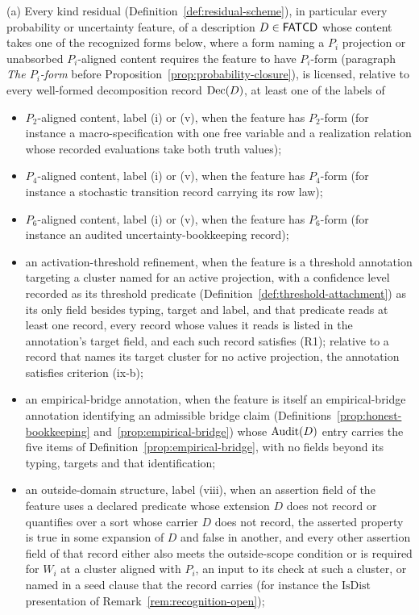 \begin{proposition}\label{prop:probability-closure}
\textup{(a)} Every kind residual (Definition~\ref{def:residual-scheme}), in particular every probability or uncertainty feature, of a description
\(D \in \mathsf{FATCD}{}\) whose content takes one of the recognized forms below,
where a form naming a \(P_i\) projection or unabsorbed \(P_i\)-aligned content
requires the feature to have \(P_i\)-form (paragraph \emph{The \(P_i\)-form}
before Proposition~\ref{prop:probability-closure}),
is licensed, relative to every well-formed decomposition record \(\operatorname{Dec}\!\left(D\right)\), at least one of the labels of
\begin{itemize}[topsep=2pt,itemsep=1pt]
  \item \(P_2\)-aligned content, label (i) or (v), when the feature has \(P_2\)-form (for
    instance a macro-specification with one free variable and a realization
    relation whose recorded evaluations take both truth values);
  \item \(P_4\)-aligned content, label (i) or (v), when the feature has \(P_4\)-form (for
    instance a stochastic transition record carrying its row law);
  \item \(P_6\)-aligned content, label (i) or (v), when the feature has \(P_6\)-form (for
    instance an audited uncertainty-bookkeeping record);
  \item an activation-threshold refinement, when the feature is a threshold
    annotation targeting a cluster named for an active projection, with a
    confidence level recorded as its threshold predicate
    (Definition~\ref{def:threshold-attachment}) as its only field besides
    typing, target and label, and that predicate reads at least one record, every record whose values it reads is listed in the annotation's target field, and each such record satisfies (R1); relative to a record that names its target cluster for
    no active projection, the annotation satisfies criterion (ix-b);
  \item an empirical-bridge annotation, when the feature is itself an empirical-bridge annotation identifying an admissible bridge claim (Definitions~\ref{prop:honest-bookkeeping} and~\ref{prop:empirical-bridge}) whose \(\operatorname{Audit}\!\left(D\right)\) entry carries the five items of Definition~\ref{prop:empirical-bridge}, with no fields beyond its typing, targets and that identification;
  \item an outside-domain structure, label (viii), when an assertion field of the feature uses a declared predicate whose extension \(D\) does not record or quantifies over a sort whose carrier \(D\) does not record, the asserted property is true in some expansion of \(D\) and false in another, and every other assertion field of that record either also meets the outside-scope condition or is required for \(W_i\) at a cluster aligned with \(P_i\), an input to its check at such a cluster, or named in a seed clause that the record carries (for instance the \(\mathrm{IsDist}\) presentation of Remark~\ref{rem:recognition-open});

\end{itemize}
\end{proposition}
